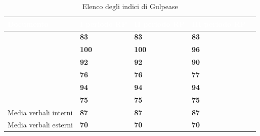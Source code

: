 \renewcommand{\arraystretch}{1.5}
\begin{longtable}{C{4cm} C{2cm} C{2cm} C{2cm} C{2cm}}
	\caption{Elenco degli indici di Gulpease }\\
	\textcolor{white}{\textbf{Documento}} & \textcolor{white}{\textbf{I periodo RP}} &
	\textcolor{white}{\textbf{II periodo RP}} & \textcolor{white}{\textbf{III periodo RP}} \\
	\hline
	\endhead
	\AdR & \textcolor{verde}{\textbf{83}} & \textcolor{verde}{\textbf{83}} & \textcolor{verde}{\textbf{83}} \\
	\PdP & \textcolor{verde}{\textbf{100}} & \textcolor{verde}{\textbf{100}} & \textcolor{verde}{\textbf{96}} \\
	\PdQ & \textcolor{verde}{\textbf{92}} & \textcolor{verde}{\textbf{92}} & \textcolor{verde}{\textbf{90}} \\

	\NdP & \textcolor{giallo}{\textbf{76}} & \textcolor{giallo}{\textbf{76}} & \textcolor{giallo}{\textbf{77}} \\
	\SdF & \textcolor{verde}{\textbf{94}} & \textcolor{verde}{\textbf{94}} & \textcolor{verde}{\textbf{94}} \\

	\Glossario & \textcolor{giallo}{\textbf{75}} & \textcolor{giallo}{\textbf{75}} & \textcolor{giallo}{\textbf{75}} \\

	Media verbali interni & \textcolor{verde}{\textbf{87}} & \textcolor{verde}{\textbf{87}} & \textcolor{verde}{\textbf{87}} \\
	Media verbali esterni & \textcolor{giallo}{\textbf{70}} & \textcolor{giallo}{\textbf{70}}  & \textcolor{giallo}{\textbf{70}} \\
	
\end{longtable}

